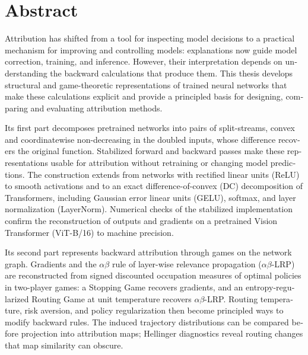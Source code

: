 \chapter*{Abstract}
\begin{otherlanguage}{english}
Attribution has shifted from a tool for inspecting model decisions to a practical mechanism for improving and controlling models: explanations now guide model correction, training, and inference. However, their interpretation depends on understanding the backward calculations that produce them. This thesis develops structural and game-theoretic representations of trained neural networks that make these calculations explicit and provide a principled basis for designing, comparing and evaluating attribution methods.

Its first part decomposes pretrained networks into pairs of split-streams, convex and coordinatewise non-decreasing in the doubled inputs, whose difference recovers the original function. Stabilized forward and backward passes make these representations usable for attribution without retraining or changing model predictions. The construction extends from networks with rectified linear units (ReLU) to smooth activations and to an exact difference-of-convex (DC) decomposition of Transformers, including Gaussian error linear units (GELU), softmax, and layer normalization (LayerNorm). Numerical checks of the stabilized implementation confirm the reconstruction of outputs and gradients on a pretrained Vision Transformer (ViT-B/16) to machine precision.

Its second part represents backward attribution through games on the network graph. Gradients and the $\alpha\beta$ rule of layer-wise relevance propagation ($\alpha\beta$-LRP) are reconstructed from signed discounted occupation measures of optimal policies in two-player games: a Stopping Game recovers gradients, and an entropy-regularized Routing Game at unit temperature recovers $\alpha\beta$-LRP. Routing temperature, risk aversion, and policy regularization then become principled ways to modify backward rules. The induced trajectory distributions can be compared before projection into attribution maps; Hellinger diagnostics reveal routing changes that map similarity can obscure.


\end{otherlanguage}

